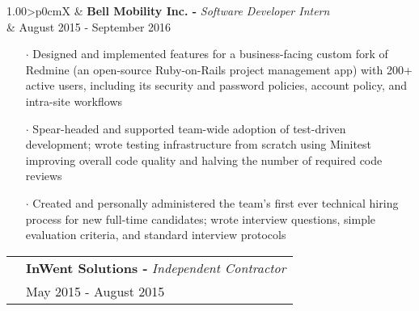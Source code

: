 \documentclass[a4paper, oneside, final]{scrartcl} %
\newcommand{\gray}{\rowcolor[gray]{.90}} %
\begin{document}
\begin{center}
  \begin{tabularx}{1.00\linewidth}{>{\raggedleft\scshape}p{0cm}X}
    \gray& \textbf{Bell Mobility Inc. -} \textit{Software Developer Intern}\\
    \gray& {August 2015 - September 2016}\\
  \end{tabularx}
  \vspace{-0.2cm}
  \begin{itemize}\itemsep-0.2cm
      \vspace{-0.1cm}

    \item[$\cdot$] Designed and implemented features for a business-facing custom fork of Redmine (an open-source Ruby-on-Rails project management app) with 200+ active users, including its security and password policies, account policy, and intra-site workflows\\
    \item[$\cdot$] Spear-headed and supported team-wide adoption of test-driven development; wrote testing infrastructure from scratch using Minitest improving overall code quality and halving the number of required code reviews \\
    \item[$\cdot$] Created and personally administered the team’s first ever technical hiring process for new full-time candidates; wrote interview questions, simple evaluation criteria, and standard interview protocols\\

  \end{itemize}

  \vspace{-0.05cm}

  \begin{tabularx}{1.00\linewidth}{>{\raggedleft\scshape}p{0cm}X}
    \gray& \textbf{InWent Solutions -} \textit{Independent Contractor}\\
    \gray& {May 2015 - August 2015}\\
  \end{tabularx}
  \vspace{-0.2cm}
  \begin{itemize}\itemsep-0.2cm
      \vspace{-0.1cm}


\end{itemize}
\end{center}
\end{document}

